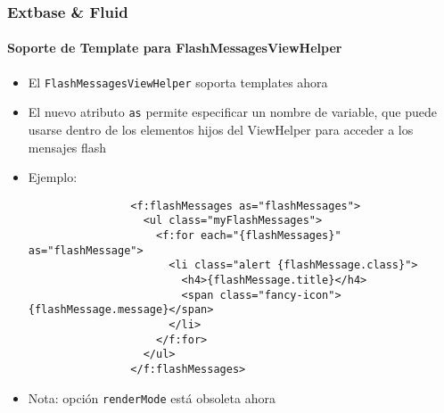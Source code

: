 
\begin{frame}[fragile]
	\frametitle{Extbase \& Fluid}
	\framesubtitle{Soporte de Template para FlashMessagesViewHelper}

	\lstset{basicstyle=\tiny\ttfamily}

	\begin{itemize}

		\item El \texttt{FlashMessagesViewHelper} soporta templates ahora

		\item El nuevo atributo \texttt{as} permite especificar un nombre de variable, que puede usarse
			dentro de los elementos hijos del ViewHelper para acceder a los mensajes flash

		\item Ejemplo:

			\begin{lstlisting}
				<f:flashMessages as="flashMessages">
				  <ul class="myFlashMessages">
				    <f:for each="{flashMessages}" as="flashMessage">
				      <li class="alert {flashMessage.class}">
				        <h4>{flashMessage.title}</h4>
				        <span class="fancy-icon">{flashMessage.message}</span>
				      </li>
				    </f:for>
				  </ul>
				</f:flashMessages>
			\end{lstlisting}

		\item Nota: opción \texttt{renderMode} está obsoleta ahora

	\end{itemize}

\end{frame}


